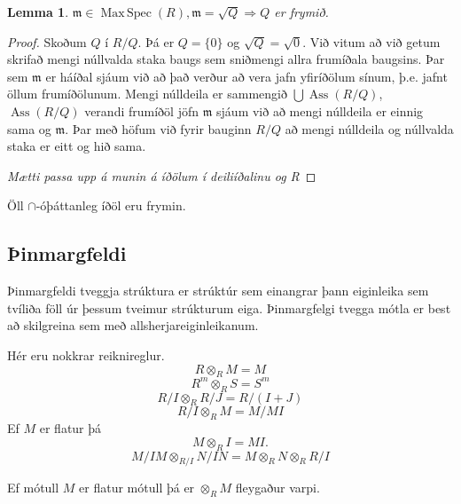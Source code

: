 \documentclass[a4paper, 14pt]{article}
\DeclareMathOperator{\Ass}{Ass}
\DeclareMathOperator{\MaxSpec}{Max\, Spec}
\newtheorem{lemma}{Lemma}
\let\tensor\otimes
\newcommand{\then}{\Longrightarrow}
\newcommand{\m}{\mathfrak{m}}
\begin{document}
\begin{lemma}
$\m \in \MaxSpec(R), \m = \sqrt{Q} \then Q$ er frymið.
\end{lemma}
\begin{proof}
Skoðum $Q$ í $R/Q$. Þá er $Q = \{ 0 \}$ og $\sqrt{Q} = \sqrt{0}$. Við vitum
að við getum skrifað mengi núllvalda staka baugs sem sniðmengi allra frumíðala baugsins.
Þar sem $\m$ er háíðal sjáum við að það verður að vera jafn yfiríðölum sínum, þ.e. jafnt
öllum frumíðölunum. Mengi núlldeila er sammengið $\bigcup \Ass(R/Q)$, $\Ass(R/Q)$ verandi 
frumíðöl jöfn $\m$ sjáum við að mengi núlldeila er einnig sama og $\m$. Þar með höfum við
fyrir bauginn $R/Q$ að mengi núlldeila og núllvalda staka er eitt og hið sama.

\emph{Mætti passa upp á munin á íðölum í deiliíðalinu og R}

\end{proof}

Öll $\cap$-óþáttanleg íðöl eru frymin.

\subsection{Þinmargfeldi}
Þinmargfeldi tveggja strúktura er strúktúr sem einangrar þann eiginleika sem
tvíliða föll úr þessum tveimur strúkturum eiga.
Þinmargfelgi tvegga mótla er best að skilgreina sem með allsherjareiginleikanum. 

\begin{center}
\end{center}

Hér eru nokkrar reiknireglur.
\[
    R \tensor_R M = M
\]
\[
    R^m \tensor_R S = S^m
\]
\[
    R/I \tensor_R R/J = R/(I + J)
\]
\[
    R/I \tensor_R M = M/MI
\]
Ef $M$ er flatur þá
\[
M \tensor_R I = MI.
\]
\[
    M/IM \tensor_{R/I} N/IN = M \tensor_R N \tensor_R R/I
\]

Ef mótull $M$ er flatur mótull þá er $ \tensor_R M$ fleygaður varpi.
\end{document}
